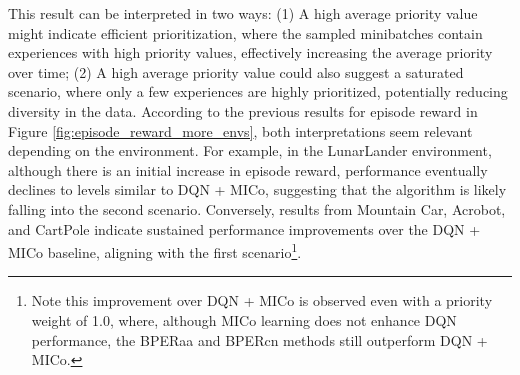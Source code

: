 This result can be interpreted in two ways: (1) A high average priority value might indicate efficient prioritization, where the sampled minibatches contain experiences with high priority values, effectively increasing the average priority over time; (2) A high average priority value could also suggest a saturated scenario, where only a few experiences are highly prioritized, potentially reducing diversity in the data. According to the previous results for episode reward in Figure \ref{fig:episode_reward_more_envs}, both interpretations seem relevant depending on the environment. For example, in the LunarLander environment, although there is an initial increase in episode reward, performance eventually declines to levels similar to DQN + MICo, suggesting that the algorithm is likely falling into the second scenario. Conversely, results from Mountain Car, Acrobot, and CartPole indicate sustained performance improvements over the DQN + MICo baseline, aligning with the first scenario\footnote{Note this improvement over DQN + MICo is observed even with a priority weight of 1.0, where, although MICo learning does not enhance DQN performance, the BPERaa and BPERcn methods still outperform DQN + MICo.}.

